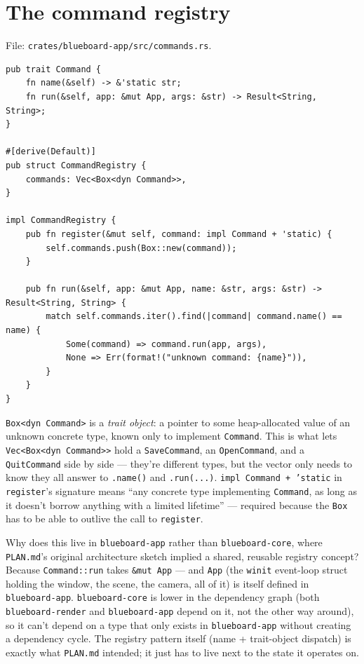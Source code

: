 \documentclass[11pt]{article}
\begin{document}
\section{The command registry}
\label{sec:registry}
File: \texttt{crates/blueboard-app/src/commands.rs}.
\begin{lstlisting}
pub trait Command {
    fn name(&self) -> &'static str;
    fn run(&self, app: &mut App, args: &str) -> Result<String, String>;
}

#[derive(Default)]
pub struct CommandRegistry {
    commands: Vec<Box<dyn Command>>,
}

impl CommandRegistry {
    pub fn register(&mut self, command: impl Command + 'static) {
        self.commands.push(Box::new(command));
    }

    pub fn run(&self, app: &mut App, name: &str, args: &str) -> Result<String, String> {
        match self.commands.iter().find(|command| command.name() == name) {
            Some(command) => command.run(app, args),
            None => Err(format!("unknown command: {name}")),
        }
    }
}
\end{lstlisting}
\texttt{Box<dyn Command>} is a \emph{trait object}: a pointer to some heap-allocated value
of an unknown concrete type, known only to implement \texttt{Command}. This is what lets
\texttt{Vec<Box<dyn Command>>} hold a \texttt{SaveCommand}, an \texttt{OpenCommand}, and a
\texttt{QuitCommand} side by side — they're different types, but the vector only needs to
know they all answer to \texttt{.name()} and \texttt{.run(...)}. \texttt{impl Command +
'static} in \texttt{register}'s signature means ``any concrete type implementing
\texttt{Command}, as long as it doesn't borrow anything with a limited lifetime'' — required
because the \texttt{Box} has to be able to outlive the call to \texttt{register}.

Why does this live in \texttt{blueboard-app} rather than \texttt{blueboard-core}, where
\texttt{PLAN.md}'s original architecture sketch implied a shared, reusable registry
concept? Because \texttt{Command::run} takes \texttt{\&mut App} — and \texttt{App} (the
\texttt{winit} event-loop struct holding the window, the scene, the camera, all of it) is
itself defined in \texttt{blueboard-app}. \texttt{blueboard-core} is lower in the
dependency graph (both \texttt{blueboard-render} and \texttt{blueboard-app} depend on it,
not the other way around), so it can't depend on a type that only exists in
\texttt{blueboard-app} without creating a dependency cycle. The registry pattern itself
(name + trait-object dispatch) is exactly what \texttt{PLAN.md} intended; it just has to
live next to the state it operates on.
\end{document}
